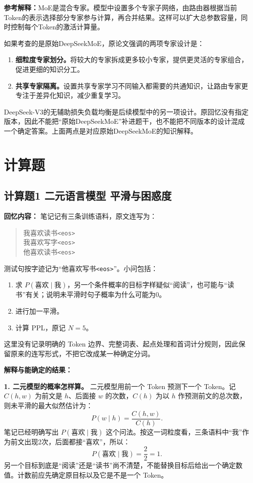 \documentclass[UTF8,a4paper,zihao=-4,fontset=windows]{ctexart}
\newcommand{\recalled}[1]{\Needspace{8\baselineskip}\subsection*{#1}}
\begin{document}
\textbf{参考解释：}MoE是混合专家。模型中设置多个专家子网络，由路由器根据当前Token的表示选择部分专家参与计算，再合并结果。这样可以扩大总参数容量，同时控制每个Token的激活计算量。

如果考查的是原始DeepSeekMoE，原论文强调的两项专家设计是：
\begin{enumerate}
\item {}\textbf{细粒度专家划分。}将较大的专家拆成更多较小专家，提供更灵活的专家组合，促进更细的知识分工。
\item {}\textbf{共享专家隔离。}设置共享专家学习不同输入都需要的共通知识，让路由专家更专注于差异化知识，减少重复学习。
\end{enumerate}
DeepSeek-V3的无辅助损失负载均衡是后续模型中的另一项设计。原回忆没有指定版本，因此不能把“原始DeepSeekMoE”补进题干，也不能把不同版本的设计混成一个确定答案。上面两点是对应原始DeepSeekMoE的知识解释。

\section{计算题}

\recalled{计算题1 二元语言模型 平滑与困惑度}

\textbf{回忆内容：}
笔记记有三条训练语料，原文连写为：
\begin{quote}
我喜欢读书\texttt{<eos>}\\
我喜欢写字\texttt{<eos>}\\
他喜欢读书\texttt{<eos>}
\end{quote}
测试句按字迹记为“他喜欢写书\texttt{<eos>}”。小问包括：
\begin{enumerate}[label=(\arabic*)]
\item {}求 $P(\text{喜欢}\mid\text{我})$，另一个条件概率的目标字样疑似“阅读”，也可能与“读书”有关；说明未平滑时句子概率为什么可能为0。
\item {}进行加一平滑。
\item {}计算 PPL，原记 $N=5$。
\end{enumerate}
这里没有记录明确的 Token 边界、完整词表、起点处理和首词计分规则，因此保留原来的连写形式，不把它改成某一种确定分词。

\textbf{解释与能确定的结果：}

\textbf{1. 二元模型的概率怎样算。}
二元模型用前一个 Token 预测下一个 Token。记 $C(h,w)$ 为前文是 $h$、后面接 $w$ 的次数，$C(h)$ 为以 $h$ 作预测前文的总次数，则未平滑的最大似然估计为：
\[
P(w\mid h)=\frac{C(h,w)}{C(h)}.
\]
笔记已经明确写出 $P(\text{喜欢}\mid\text{我})$ 这个问法。按这一词粒度看，三条语料中“我”作为前文出现2次，后面都接“喜欢”，所以：
\[
\boxed{P(\text{喜欢}\mid\text{我})=\frac22=1.}
\]
另一个目标到底是“阅读”还是“读书”尚不清楚，不能替换目标后给出一个确定数值。计数前应先确定原目标以及它是不是一个 Token。
\end{document}
